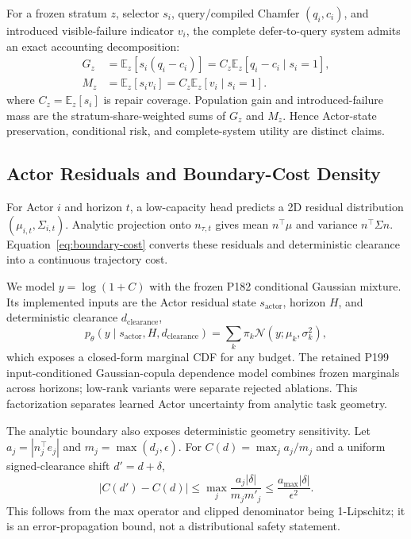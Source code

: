 For a frozen stratum $z$, selector $s_i$, query/compiled Chamfer $(q_i,c_i)$, and introduced visible-failure indicator $v_i$,
the complete defer-to-query system admits an exact accounting decomposition:
\begin{equation}
\begin{aligned}
G_z&=\mathbb{E}_z[s_i(q_i-c_i)]=C_z\mathbb{E}_z[q_i-c_i\mid s_i=1],\\
M_z&=\mathbb{E}_z[s_iv_i]=C_z\mathbb{E}_z[v_i\mid s_i=1].
\end{aligned}
\end{equation}
where $C_z=\mathbb{E}_z[s_i]$ is repair coverage. Population gain and introduced-failure mass are the stratum-share-weighted
sums of $G_z$ and $M_z$. Hence Actor-state preservation, conditional risk, and complete-system utility are distinct claims.

\subsection{Actor Residuals and Boundary-Cost Density}

For Actor $i$ and horizon $t$, a low-capacity head predicts a 2D residual distribution $(\mu_{i,t},\Sigma_{i,t})$. Analytic projection onto $n_{\tau,t}$ gives mean $n^\top\mu$ and variance $n^\top\Sigma n$. Equation~\ref{eq:boundary-cost} converts these residuals and deterministic clearance into a continuous trajectory cost.

We model $y=\log(1+C)$ with the frozen P182 conditional Gaussian mixture. Its implemented inputs are the Actor residual state $s_{\mathrm{actor}}$, horizon $H$, and deterministic clearance $d_{\mathrm{clearance}}$,
\begin{equation}
p_\theta(y\mid s_{\mathrm{actor}},H,d_{\mathrm{clearance}})=\sum_k\pi_k\mathcal{N}(y;\mu_k,\sigma_k^2),
\end{equation}
which exposes a closed-form marginal CDF for any budget. The retained P199 input-conditioned Gaussian-copula dependence model combines frozen marginals across horizons; low-rank variants were separate rejected ablations. This factorization separates learned Actor uncertainty from analytic task geometry.

The analytic boundary also exposes deterministic geometry sensitivity. Let $a_j=|n_j^\top e_j|$ and
$m_j=\max(d_j,\epsilon)$. For $C(d)=\max_j a_j/m_j$ and a uniform signed-clearance shift $d'=d+\delta$,
\begin{equation}
|C(d')-C(d)|\leq\max_j\frac{a_j|\delta|}{m_jm'_j}
\leq\frac{a_{\max}|\delta|}{\epsilon^2}.
\end{equation}
This follows from the max operator and clipped denominator being 1-Lipschitz; it is an error-propagation bound, not a
distributional safety statement.

